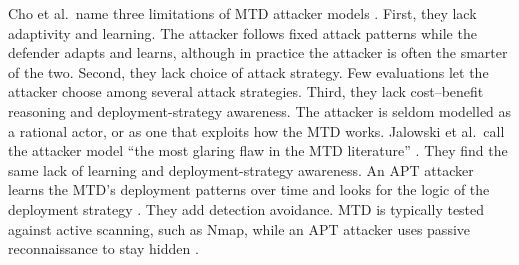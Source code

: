 \documentclass{cshonours}
\begin{document}
Cho et al.\ name three limitations of MTD attacker models \citep{cho2020}.
First, they lack adaptivity and learning. The attacker follows fixed
attack patterns while the defender adapts and learns, although in
practice the attacker is often the smarter of the two. Second, they lack choice of attack strategy. Few evaluations let the attacker choose among
several attack strategies. Third, they lack cost--benefit reasoning and deployment-strategy awareness. The attacker is seldom modelled as a rational actor,
or as one that exploits how the MTD works. Jalowski et al.\ call the
attacker model ``the most glaring flaw in the MTD literature''
\citep[p.~8]{jalowski2026}. They find the same lack of learning and deployment-strategy
awareness. An APT attacker learns the MTD's deployment patterns over time
and looks for the logic of the deployment strategy \citep{jalowski2026}. They add detection avoidance. MTD is typically tested against active scanning, such as Nmap,
while an APT attacker uses passive reconnaissance to stay hidden
\citep{jalowski2026}.
\end{document}
